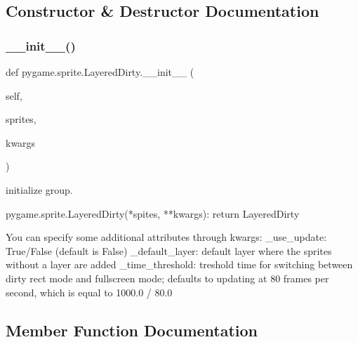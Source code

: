 \subsection{Constructor \& Destructor Documentation}
\mbox{\label{classpygame_1_1sprite_1_1_layered_dirty_ab278c1a444f897806ed7fa38f6d19174}} 
\subsubsection{\texorpdfstring{\+\_\+\+\_\+init\+\_\+\+\_\+()}{\_\_init\_\_()}}
{\footnotesize\ttfamily def pygame.\+sprite.\+Layered\+Dirty.\+\_\+\+\_\+init\+\_\+\+\_\+ (\begin{DoxyParamCaption}\item[{}]{self,  }\item[{}]{sprites,  }\item[{}]{kwargs }\end{DoxyParamCaption})}

\begin{DoxyVerb}initialize group.

pygame.sprite.LayeredDirty(*spites, **kwargs): return LayeredDirty

You can specify some additional attributes through kwargs:
    _use_update: True/False   (default is False)
    _default_layer: default layer where the sprites without a layer are
added
    _time_threshold: treshold time for switching between dirty rect
mode and fullscreen mode; defaults to updating at 80 frames per
second, which is equal to 1000.0 / 80.0\end{DoxyVerb}
 

\subsection{Member Function Documentation}
\mbox{\label{classpygame_1_1sprite_1_1_layered_dirty_a223c7367547ef857ed23cc71cec57e25}} 
